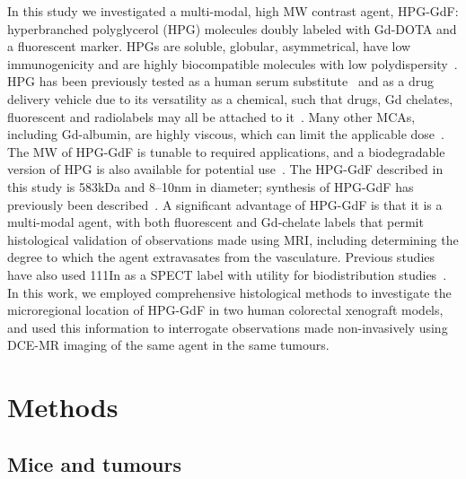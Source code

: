 In this study we investigated a multi-modal, high MW contrast agent, HPG-GdF: hyperbranched polyglycerol (HPG) molecules doubly labeled with Gd-DOTA and a fluorescent marker.
HPGs are soluble, globular, asymmetrical, have low immunogenicity and are highly biocompatible molecules with low polydispersity~\cite{Saatchi:2012hc,Kainthan:2006ce,Saatchi:2012gc}.
HPG has been previously tested as a human serum substitute~\cite{Kainthan:2008ek} and as a drug delivery vehicle due to its versatility as a chemical, such that drugs, Gd chelates, fluorescent and radiolabels may all be attached to it~\cite{Shenoi:2013id}.
Many other MCAs, including Gd-albumin, are highly viscous, which can limit the applicable dose~\cite{Imranulhaq:2012ij}.
The MW of HPG-GdF is tunable to required applications, and a biodegradable version of HPG is also available for potential use~\cite{Shenoi:2013id}.
The HPG-GdF described in this study is 583kDa and 8–10nm in diameter; synthesis of HPG-GdF has previously been described~\cite{Saatchi:2012hc}.
A significant advantage of HPG-GdF is that it is a multi-modal agent, with both fluorescent and Gd-chelate labels that permit histological validation of observations made using MRI, including determining the degree to which the agent extravasates from the vasculature.
Previous studies have also used 111In as a SPECT label with utility for biodistribution studies~\cite{Saatchi:2012hc}.
In this work, we employed comprehensive histological methods to investigate the microregional location of HPG-GdF in two human colorectal xenograft models, and used this information to interrogate observations made non-invasively using DCE-MR imaging of the same agent in the same tumours.

\section{Methods}

\subsection{Mice and tumours}

